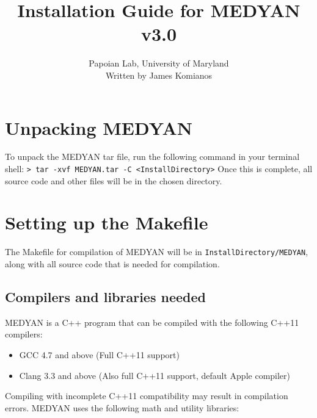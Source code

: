 \documentclass[11pt, oneside]{article}   	%
\title{Installation Guide for MEDYAN v3.0}
\author{Papoian Lab, University of Maryland \\ Written by James Komianos}
\date{}							%
\begin{document}
\maketitle

\tableofcontents
\newpage

\section{Unpacking MEDYAN}
 
 To unpack the MEDYAN tar file, run the following command in your terminal shell: \newline \newline \indent\texttt{> tar -xvf MEDYAN.tar -C <InstallDirectory>} \newline \newline Once this is complete, all source code and other files will be in the chosen directory.
 
 
\section{Setting up the Makefile}

The Makefile for compilation of MEDYAN will be in \texttt{InstallDirectory/MEDYAN}, along with all source code that is needed for compilation.

\subsection {Compilers and libraries needed}

MEDYAN is a C++ program that can be compiled with the following C++11 compilers:

\begin{itemize}
\item GCC 4.7 and above (Full C++11 support)
\item  Clang 3.3 and above (Also full C++11 support, default Apple compiler)
\end{itemize}  

\noindent Compiling with incomplete C++11 compatibility may result in compilation errors. \newline MEDYAN uses the following math and utility libraries:
\end{document}
